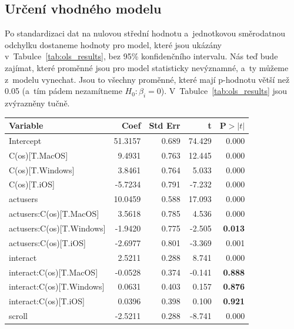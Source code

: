 \documentclass[a4paper, 11pt]{article}
\begin{document}
\subsection{Určení vhodného modelu}

Po standardizaci dat na nulovou střední hodnotu a~jednotkovou směrodatnou odchylku dostaneme hodnoty pro model, které jsou ukázány v~Tabulce~\ref{tab:ols_results}, bez 95\% konfidenčního intervalu.
Nás teď bude zajímat, které proměnné jsou pro model statisticky nevýznamné, a~ty můžeme z~modelu vynechat.
Jsou to všechny proměnné, které mají p-hodnotu větší než 0.05 (a~tím pádem nezamítneme $H_0: \beta_i = 0$).
V~Tabulce~\ref{tab:ols_results} jsou zvýrazněny tučně.

\begin{table}[ht]
    \centering
        \begin{tabularx}{0.8\textwidth}{lRRRR}
            \toprule
            \textbf{Variable} & \textbf{Coef} & \textbf{Std Err} & \textbf{t} & \textbf{P$> |t|$} \\
            \midrule
            Intercept                    & 51.3157 & 0.689 & 74.429 & 0.000 \\
            C(os)[T.MacOS]               & 9.4931  & 0.763 & 12.445 & 0.000 \\
            C(os)[T.Windows]             & 3.8461  & 0.764 & 5.033  & 0.000 \\
            C(os)[T.iOS]                 & -5.7234 & 0.791 & -7.232 & 0.000 \\
            actusers                     & 10.0459 & 0.588 & 17.093 & 0.000 \\
            actusers:C(os)[T.MacOS]      & 3.5618  & 0.785 & 4.536  & 0.000 \\
            actusers:C(os)[T.Windows]    & -1.9420 & 0.775 & -2.505 & \textbf{0.013} \\
            actusers:C(os)[T.iOS]        & -2.6977 & 0.801 & -3.369 & 0.001  \\
            interact                     & 2.5211  & 0.288 & 8.741  & 0.000 \\
            interact:C(os)[T.MacOS]      & -0.0528 & 0.374 & -0.141 & \textbf{0.888} \\
            interact:C(os)[T.Windows]    & 0.0631  & 0.403 & 0.157  & \textbf{0.876} \\
            interact:C(os)[T.iOS]        & 0.0396  & 0.398 & 0.100  & \textbf{0.921} \\
            scroll                       & -2.5211 & 0.288 & -8.741 & 0.000  \\

\end{tabularx}
\end{table}
\end{document}
